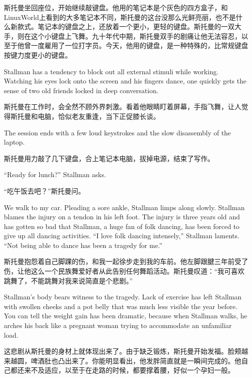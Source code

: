 \ifdefined\chs
斯托曼坐回座位，开始继续敲键盘。他用的笔记本是个灰色的四方盒子，和LinuxWorld上看到的大多笔记本不同，斯托曼的这台没那么光鲜亮丽，也不是什么新款式。笔记本的键盘之上，还放着一个更小，更轻的键盘。斯托曼的一双大手，则在这个小键盘上飞舞。九十年代中期，斯托曼双手的剧痛让他无法容忍，以至于他曾一度雇用了一位打字员。今天，他用的键盘，是一种特殊的，比常规键盘按键力度更小的键盘。
\fi

\ifdefined\eng
Stallman has a tendency to block out all external stimuli while working. Watching his eyes lock onto the screen and his fingers dance, one quickly gets the sense of two old friends locked in deep conversation.
\fi

\ifdefined\chs
斯托曼在工作时，会全然不顾外界刺激。看着他眼睛盯着屏幕，手指飞舞，让人觉得斯托曼和电脑，恰似老友重逢，当下正促膝长谈。
\fi

\ifdefined\eng
The session ends with a few loud keystrokes and the slow disassembly of the laptop.
\fi

\ifdefined\chs
斯托曼用力敲了几下键盘，合上笔记本电脑，拔掉电源，结束了写作。
\fi

\ifdefined\eng
``Ready for lunch?'' Stallman asks.
\fi

\ifdefined\chs
``吃午饭去吧？''斯托曼问。
\fi

\ifdefined\eng
We walk to my car. Pleading a sore ankle, Stallman limps along slowly. Stallman blames the injury on a tendon in his left foot. The injury is three years old and has gotten so bad that Stallman, a huge fan of folk dancing, has been forced to give up all dancing activities. ``I love folk dancing intensely,'' Stallman laments. ``Not being able to dance has been a tragedy for me.''
\fi

\ifdefined\chs
斯托曼抱怨着自己脚踝的伤，和我一起徐步走到我的车前。他左脚跟腱三年前受了伤，让他这么一个民族舞爱好者从此告别任何舞蹈活动。斯托曼叹道：``我可喜欢跳舞了，不能跳舞对我来说简直是个悲剧。''
\fi

\ifdefined\eng
Stallman's body bears witness to the tragedy. Lack of exercise has left Stallman with swollen cheeks and a pot belly that was much less visible the year before. You can tell the weight gain has been dramatic, because when Stallman walks, he arches his back like a pregnant woman trying to accommodate an unfamiliar load.
\fi

\ifdefined\chs
这悲剧从斯托曼的身材上就体现出来了。由于缺乏锻炼，斯托曼开始发福。脸颊越来越圆，啤酒肚也凸出来了。你能明显看出，他发胖简直就是一瞬间完成的。他自己都还来不及适应，以至于在走路的时候，都要撑着腰，好似一个孕妇一般。
\fi

